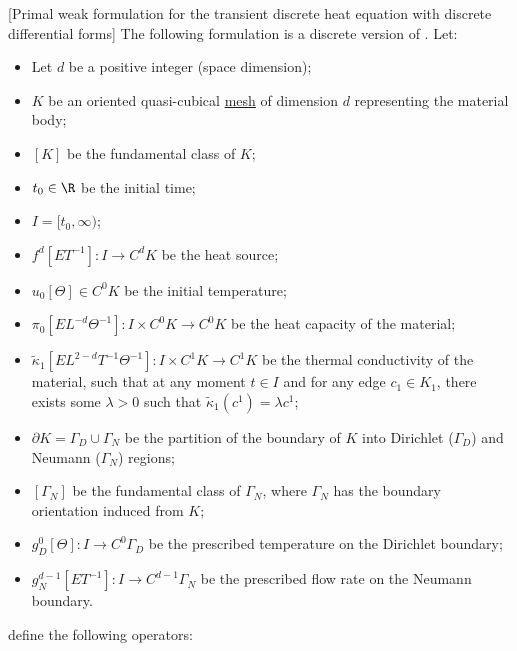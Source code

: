 \begin{formulation}
  \label{cmc/diffusion/discrete/transient/primal_weak-formulation}
  [Primal weak formulation for the transient discrete heat equation
    with discrete differential forms]
  The following formulation is a discrete version of
  .
  Let:
  \begin{itemize}
    \item
      Let $d$ be a positive integer (space dimension);
    \item
      $K$ be an oriented quasi-cubical \hyperref[cmc:mesh:definition]{mesh} of
      dimension $d$ representing the material body;
    \item
      $[K]$ be the fundamental class of $K$;
    \item
      $t_0 \in \R$ be the initial time;
    \item
      $I = [t_0, \infty)$;
    \item
      $f^d [E T^{-1}] \colon I \to C^d K$ be the heat source;
    \item
      $u_0 [\Theta] \in C^0 K$ be the initial temperature;
    \item
      $\pi_0 [E L^{-d} \Theta^{-1}] \colon I \times C^0 K \to C^0 K$
      be the heat capacity of the material;
    \item
      $\tilde{\kappa}_1 [E L^{2 - d} T^{-1} \Theta^{-1}]
      \colon I \times C^1 K \to C^1 K$
      be the thermal conductivity of the material, such that at any moment
      $t \in I$ and for any edge $c_1 \in K_1$, there exists some $\lambda > 0$
      such that $\tilde{\kappa}_1(c^1) = \lambda c^1$;
    \item
      $\partial K = \Gamma_D \cup \Gamma_N$ be the partition of the boundary of
      $K$ into Dirichlet ($\Gamma_D$) and Neumann ($\Gamma_N$) regions;
    \item
      $[\Gamma_N]$ be the fundamental class of $\Gamma_N$, where $\Gamma_N$
      has the boundary orientation induced from $K$;
    \item
      $g_D^0 [\Theta] \colon I \to C^0 \Gamma_D$
      be the prescribed temperature on the Dirichlet boundary;
    \item
      $g_N^{d - 1} [E T^{-1}] \colon I \to C^{d - 1} \Gamma_N$
      be the prescribed flow rate on the Neumann boundary.
  \end{itemize}
  define the following operators:
  \begin{subequations}
    \begin{alignat}{3}

\end{alignat}
\end{subequations}
\end{formulation}
